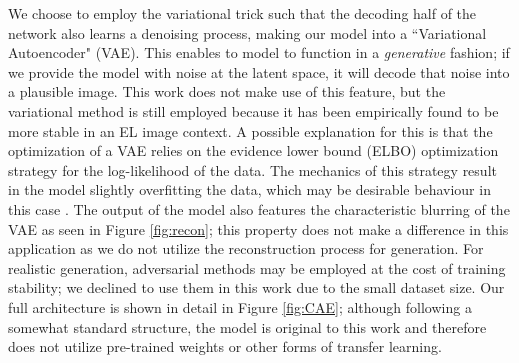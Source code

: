 \documentclass[conference]{IEEEtran}
\begin{document}
We choose to employ the variational trick such that the decoding half of the network also learns a denoising process, making our model into a ``Variational Autoencoder" (VAE). 
This enables to model to function in a \textit{generative} fashion; if we provide the model with noise at the latent space, it will decode that noise into a plausible image. 
This work does not make use of this feature, but the variational method is still employed because it has been empirically found to be more stable in an EL image context. 
A possible explanation for this is that the optimization of a VAE relies on the evidence lower bound (ELBO) optimization strategy for the log-likelihood of the data. 
The mechanics of this strategy result in the model slightly overfitting the data, which may be desirable behaviour in this case \cite{shekhovtsov2022vae}. 
The output of the model also features the characteristic blurring of the VAE as seen in Figure \ref{fig:recon}; this property does not make a difference in this application as we do not utilize the reconstruction process for generation. 
For realistic generation, adversarial methods \cite{plumerault_avae_2020} may be employed at the cost of training stability; we declined to use them in this work due to the small dataset size. 
Our full architecture is shown in detail in Figure \ref{fig:CAE}; although following a somewhat standard structure, the model is original to this work and therefore does not utilize pre-trained weights or other forms of transfer learning. 
\end{document}
